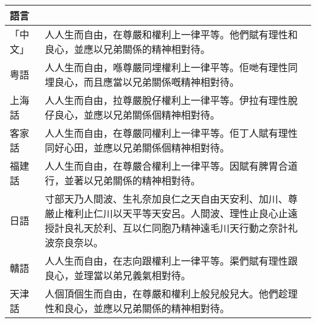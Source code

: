 \begin{longtable}{|l|p{8cm}|}
    \hline
  
    \textbf{語言} & \textbf{}                                                                                                                                                       \\
    \hline
    \jcz{}
    \batang{}
    「中文」        & 人人生而自由，在尊嚴和權利上一律平等。他們賦有理性和良心，並應以兄弟關係的精神相對待。                                                                                                                     \\
    \hline
    粤語          & 人人生而自由，喺尊嚴同埋權利上一律平等。佢哋有理性同埋良心，而且應當以兄弟關係嘅精神相對待。                                                                                                                  \\
    \hline
    上海話         & 人人生而自由，拉尊嚴脫仔權利上一律平等。伊拉有理性脫仔良心，並應以兄弟關係個精神相對待。                                                                                                                    \\
    \hline
    客家話         & 人人生而自由，在尊嚴同權利上一律平等。佢丁人賦有理性同好心田，並應以兄弟關係個精神相對待。                                                                                                                   \\
    \hline
    福建話         & 人人生而自由，在尊嚴合權利上一律平等。因賦有脾胃合道行，並著以兄弟關係的精神相對待。                                                                                                                      \\
    \hline
    日語          & 寸部天乃人間波、生礼奈加良仁之天自由天安利、加川、尊厳止権利止仁川以天平等天安呂。人間波、理性止良心止遠授計良礼天於利、互以仁同胞乃精神遠毛川天行動之奈計礼波奈良奈以。                                                                            \\
    \hline
    贛語          & 人人生而自由，在志向跟權利上一律平等。渠們賦有理性跟良心，並理當以弟兄義氣相對待。                                                                                                                       \\
    \hline
    天津話         & 人個頂個生而自由，在尊嚴和權利上般兒般兒大。他們趁理性和良心，並應以兄弟關係的精神相對待。                                                                                                                   \\

\end{longtable}
